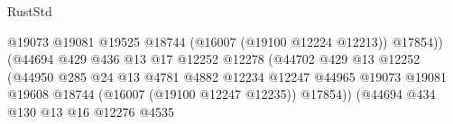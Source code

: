\begin{lexlean}{RustStd}
\begin{coremodule}
                                                            @19073
                                                            @19081
                                                            @19525
                                                            @18744
                                                            (@16007 (@19100 @12224 @12213))
                                                            @17854))
                                                        (@44694
                                                          @429
                                                          @436
                                                          @13
                                                          @17
                                                          @12252
                                                          @12278
                                                          (@44702
                                                            @429
                                                            @13
                                                            @12252
                                                            (@44950
                                                              @285
                                                              @24
                                                              @13
                                                              @4781
                                                              @4882
                                                              @12234
                                                              @12247
                                                              @44965
                                                              @19073
                                                              @19081
                                                              @19608
                                                              @18744
                                                              (@16007 (@19100 @12247 @12235))
                                                              @17854))
                                                          (@44694
                                                            @434
                                                            @130
                                                            @13
                                                            @16
                                                            @12276
                                                            @4535

\end{coremodule}
\end{lexlean}

